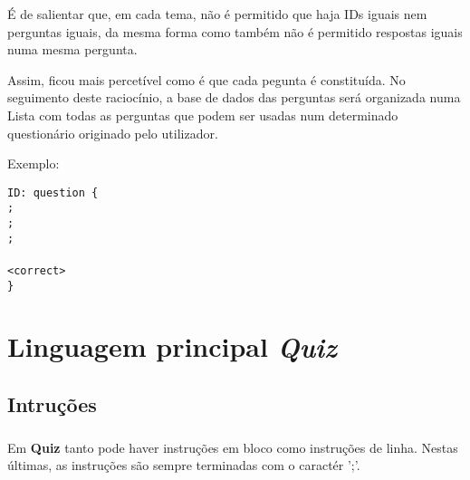 \documentclass{report}
\begin{document}
É de salientar que, em cada tema, não é permitido que haja IDs iguais nem perguntas iguais, da mesma forma como também não é permitido respostas iguais numa mesma pergunta.

Assim, ficou mais percetível como é que cada pegunta é constituída. No seguimento deste raciocínio, a base de dados das perguntas será organizada numa Lista com todas as perguntas que podem ser usadas num determinado questionário originado pelo utilizador.

Exemplo:

\begin{tabbing}
	\texttt{ID: question \{ }\\
	\texttt{\quad\quad{};}\\
	\texttt{\quad\quad{};}\\
	\texttt{\quad\quad\quad <multiple|match|numeric|short|long>;}\\
	\texttt{\quad\quad\quad <possible answers>}\\
	\texttt{\quad\quad\quad <correct>}\\
	\texttt{\}}\\
\end{tabbing}


\chapter{Linguagem principal \textit{Quiz}}
\label{chap.lprincipal}

\paragraph{}

\section{Intruções}

\paragraph{}

Em \textbf{Quiz} tanto pode haver instruções em bloco como instruções de linha. Nestas últimas, as instruções são sempre terminadas com o caractér ';'. 

\end{document}
